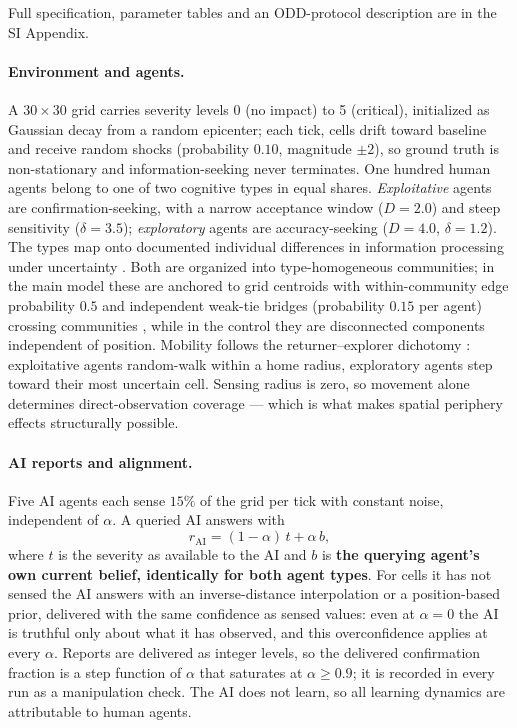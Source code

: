 \documentclass[pdflatex,sn-nature]{sn-jnl}
\begin{document}
Full specification, parameter tables and an ODD-protocol description are in the SI Appendix.

\paragraph{Environment and agents.} A $30 \times 30$ grid carries severity levels 0 (no impact) to 5 (critical), initialized as Gaussian decay from a random epicenter; each tick, cells drift toward baseline and receive random shocks (probability $0.10$, magnitude $\pm 2$), so ground truth is non-stationary and information-seeking never terminates. One hundred human agents belong to one of two cognitive types in equal shares. \emph{Exploitative} agents are confirmation-seeking, with a narrow acceptance window ($D = 2.0$) and steep sensitivity ($\delta = 3.5$); \emph{exploratory} agents are accuracy-seeking ($D = 4.0$, $\delta = 1.2$). The types map onto documented individual differences in information processing under uncertainty \citep{hertwig2016homo,march1991exploration}. Both are organized into type-homogeneous communities; in the main model these are anchored to grid centroids with within-community edge probability $0.5$ and independent weak-tie bridges (probability $0.15$ per agent) crossing communities \citep{granovetter1973strength}, while in the control they are disconnected components independent of position. Mobility follows the returner--explorer dichotomy \citep{pappalardo2015returners}: exploitative agents random-walk within a home radius, exploratory agents step toward their most uncertain cell. Sensing radius is zero, so movement alone determines direct-observation coverage --- which is what makes spatial periphery effects structurally possible.

\paragraph{AI reports and alignment.} Five AI agents each sense $15\%$ of the grid per tick with constant noise, independent of $\alpha$. A queried AI answers with
\begin{equation}
r_{\text{AI}} = (1 - \alpha)\, t + \alpha\, b,
\label{eq:alignment}
\end{equation}
where $t$ is the severity as available to the AI and $b$ is \textbf{the querying agent's own current belief, identically for both agent types}. For cells it has not sensed the AI answers with an inverse-distance interpolation or a position-based prior, delivered with the same confidence as sensed values: even at $\alpha = 0$ the AI is truthful only about what it has observed, and this overconfidence applies at every $\alpha$. Reports are delivered as integer levels, so the delivered confirmation fraction is a step function of $\alpha$ that saturates at $\alpha \geq 0.9$; it is recorded in every run as a manipulation check. The AI does not learn, so all learning dynamics are attributable to human agents.
\end{document}
